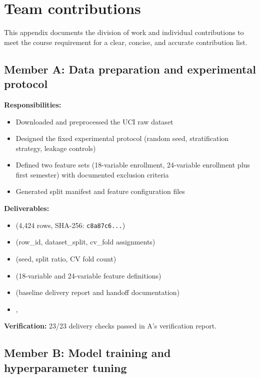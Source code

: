 \section{Team contributions}
\label{app:contributions}

This appendix documents the division of work and individual contributions to meet the course
requirement for a clear, concise, and accurate contribution list.

\subsection{Member A: Data preparation and experimental protocol}

\textbf{Responsibilities:}
\begin{itemize}[leftmargin=*]
  \item Downloaded and preprocessed the UCI raw dataset
  \item Designed the fixed experimental protocol (random seed, stratification strategy, leakage controls)
  \item Defined two feature sets (18-variable enrollment, 24-variable enrollment plus first semester) with documented exclusion criteria
  \item Generated split manifest and feature configuration files
\end{itemize}

\textbf{Deliverables:}
\begin{itemize}[leftmargin=*]
  \item {} (4,424 rows, SHA-256: \texttt{c8a87c6...})
  \item {} (row\_id, dataset\_split, cv\_fold assignments)
  \item {} (seed, split ratio, CV fold count)
  \item {} (18-variable and 24-variable feature definitions)
  \item {} (baseline delivery report and handoff documentation)
  \item {}, 
\end{itemize}

\textbf{Verification:} 23/23 delivery checks passed in A's verification report.

\subsection{Member B: Model training and hyperparameter tuning}

